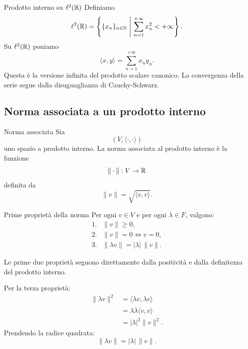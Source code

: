 \documentclass[a4paper]{article}
\begin{document}
\begin{snippetexample}{Prodotto interno su \(\ell^2(\mathbb{R})\)}
    Definiamo
    \[
        \ell^2(\mathbb{R})
        =
        \left\{
            \{x_n\}_{n\in\mathbb{N}}
            \ \middle|\
            \sum_{n=1}^{+\infty}x_n^2<+\infty
        \right\}.
    \]
    Su \(\ell^2(\mathbb{R})\) poniamo
    \[
        \langle x,y\rangle
        =
        \sum_{n=1}^{+\infty}x_ny_n.
    \]
    Questa è la versione infinita del prodotto scalare canonico. La convergenza della serie segue dalla disuguaglianza di Cauchy-Schwarz.
\end{snippetexample}

\subsection{Norma associata a un prodotto interno}

\begin{snippetdefinition}{Norma associata}
    Sia
    \[
        (V,\langle\cdot,\cdot\rangle)
    \]
    uno spazio a prodotto interno. La norma associata al prodotto interno è la funzione
    \[
        \|\cdot\|:V\to\mathbb{R}
    \]
    definita da
    \[
        \|v\|=\sqrt{\langle v,v\rangle}.
    \]
\end{snippetdefinition}

\begin{snippetproposition}{Prime proprietà della norma}
    Per ogni \(v\in V\) e per ogni \(\lambda\in F\), valgono:
    \[
        \begin{array}{ll}
            \text{1.} & \|v\|\geq 0,\\[1mm]
            \text{2.} & \|v\|=0 \Longleftrightarrow v=0,\\[1mm]
            \text{3.} & \|\lambda v\|=|\lambda|\,\|v\|.
        \end{array}
    \]
\end{snippetproposition}

\begin{snippetproof}{}
    Le prime due proprietà seguono direttamente dalla positività e dalla definitezza del prodotto interno.

    Per la terza proprietà:
    \begin{align*}
        \|\lambda v\|^2
        &=
        \langle \lambda v,\lambda v\rangle\\
        &=
        \lambda\overline{\lambda}\langle v,v\rangle\\
        &=
        |\lambda|^2\|v\|^2.
    \end{align*}
    Prendendo la radice quadrata:
    \[
        \|\lambda v\|=|\lambda|\,\|v\|.
    \]
\end{snippetproof}
\end{document}
